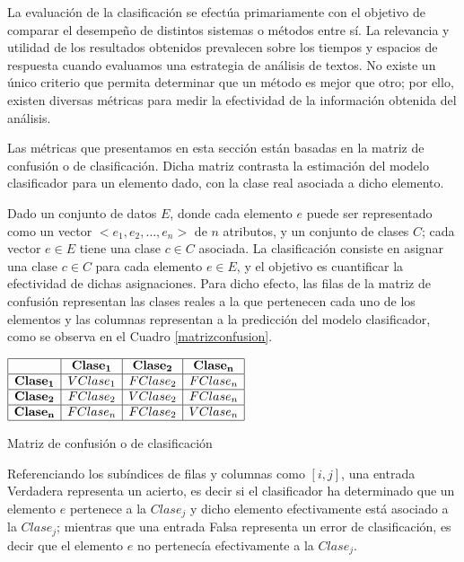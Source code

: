 {La evaluaci\'on de la clasificaci\'on se efect\'ua primariamente con el objetivo de comparar el desempe\~no de distintos sistemas o m\'etodos entre s\'i. La relevancia y utilidad de los resultados obtenidos prevalecen sobre los tiempos y espacios de respuesta cuando evaluamos una estrategia de an\'alisis de textos. No existe un \'unico criterio que permita determinar que un m\'etodo es mejor que otro; por ello, existen diversas m\'etricas para medir la efectividad de la informaci\'on obtenida del an\'alisis.
\newline

Las m\'etricas que presentamos en esta secci\'on est\'an basadas en la matriz de confusi\'on o de clasificaci\'on. Dicha matriz contrasta la estimaci\'on del modelo clasificador para un elemento dado, con la clase real asociada a dicho elemento.
\newline

Dado un conjunto de datos $E$, donde cada elemento $e$ puede ser representado como un vector $< e_1, e_2, \dots, e_n >$ de $n$ atributos, y un conjunto de clases $C$; cada vector $e \in E$ tiene una clase $c \in C$ asociada. La clasificaci\'on consiste en asignar una clase $c \in C$ para cada elemento $e \in E$, y el objetivo es cuantificar la efectividad de dichas asignaciones. Para dicho efecto, las filas de la matriz de confusi\'on representan las clases reales a la que pertenecen cada uno de los elementos y las columnas representan a la predicci\'on del modelo clasificador, como se observa en el Cuadro \ref{matrizconfusion}.
\newline

\begin{table}[htb] 
\centering

$
\begin{array}{|c|c|c|c|}
      \hline
         				& \mathbf{Clase_1}	& \mathbf{Clase_2}	& \mathbf{Clase_n}	\\
      \hline
      \mathbf{Clase_1}  & V	Clase_1	& F Clase_2	& F Clase_n	\\
      \hline
      \mathbf{Clase_2} 	& F Clase_2 & V Clase_2 & F Clase_n	\\
      \hline
      \mathbf{Clase_n}	& F Clase_n	& F	Clase_2	& V Clase_n	\\
      \hline
\end{array}
$
\caption{Matriz de confusi\'on o de clasificaci\'on}
\label{matrizconfusion}
\end{table}

Referenciando los sub\'indices de filas y columnas como $[i,j]$, una entrada Verdadera representa un acierto, es decir si el clasificador ha determinado que un elemento $e$ pertenece a la $Clase_j$ y dicho elemento efectivamente est\'a asociado a la $Clase_j$; mientras que una entrada Falsa representa un error de clasificaci\'on, es decir que el elemento $e$ no pertenec\'ia efectivamente a la $Clase_j$.
\newline

}
